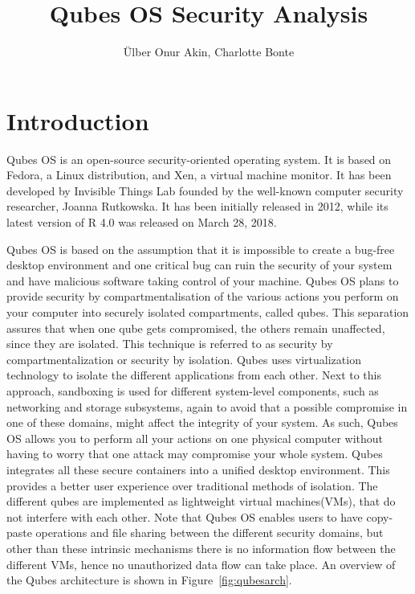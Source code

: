 \documentclass[runningheads,a4paper]{article}
\begin{document}
\title{Qubes OS Security Analysis}

\author{\"Ulber Onur Akin, Charlotte Bonte}

\maketitle

\tableofcontents

\newpage
\section{Introduction}
Qubes OS is an open-source security-oriented operating system.  It is
based on Fedora, a Linux distribution, and Xen, a virtual machine
monitor.  It has been developed by Invisible Things Lab founded by the
well-known computer security researcher, Joanna Rutkowska. It has been
initially released in 2012, while its latest version of R 4.0 was
released on March 28, 2018.

Qubes OS is based on the assumption that it is impossible to create a
bug-free desktop environment and one critical bug can ruin the
security of your system and have malicious software taking control
of your machine. Qubes OS plans to provide security by
compartmentalisation of the various actions you perform on your
computer into securely isolated compartments, called qubes.  This
separation assures that when one qube gets compromised, the others
remain unaffected, since they are isolated.  This technique is
referred to as security by compartmentalization or security by
isolation.  Qubes uses virtualization technology to isolate the
different applications from each other. Next to this approach,
sandboxing is used for different system-level components, such as
networking and storage subsystems, again to avoid that a possible
compromise in one of these domains, might affect the integrity of your
system. As such, Qubes OS allows you to perform all your actions on
one physical computer without having to worry that one attack may
compromise your whole system. Qubes integrates all these secure
containers into a unified desktop environment. This provides a better
user experience over traditional methods of isolation. The different
qubes are implemented as lightweight virtual machines(VMs), that do
not interfere with each other.  Note that Qubes OS enables users to
have copy-paste operations and file sharing between the different
security domains, but other than these intrinsic mechanisms there is
no information flow between the different VMs, hence no unauthorized
data flow can take place. An overview of the Qubes architecture is
shown in Figure~\ref{fig:qubesarch}.
\end{document}
